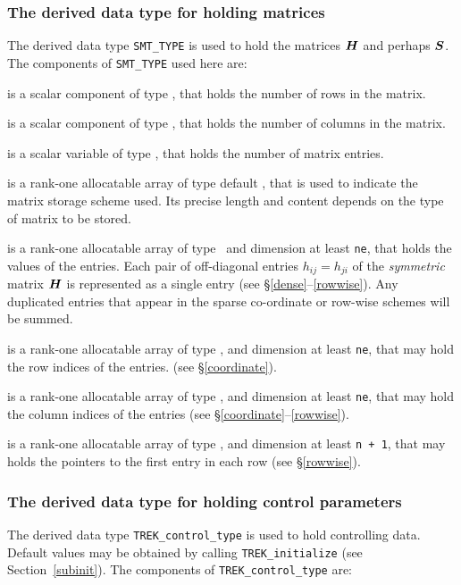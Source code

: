 \documentclass{galahad}
\newcommand{\packagename}{TREK}
\begin{document}
\subsubsection{The derived data type for holding matrices}\label{typesmt}
The derived data type {\tt SMT\_TYPE} is used to hold the matrices ${\bm{H}}$
and perhaps ${\bm{S}}$.
The components of {\tt SMT\_TYPE} used here are:

\begin{description}

 is a scalar component of type \integer,
that holds the number of rows in the matrix.

 is a scalar component of type \integer,
that holds the number of columns in the matrix.

 is a scalar variable of type \integer, that
holds the number of matrix entries.

 is a rank-one allocatable array of type default \character, that
is used to indicate the matrix storage scheme used. Its precise length and
content depends on the type of matrix to be stored.

 is a rank-one allocatable array of type \realdp\,
and dimension at least {\tt ne}, that holds the values of the entries.
Each pair of off-diagonal entries $h_{ij} = h_{ji}$ of the {\em symmetric}
matrix ${\bm{H}}$ is represented as a single entry
(see \S\ref{dense}--\ref{rowwise}).
Any duplicated entries that appear in the sparse
co-ordinate or row-wise schemes will be summed.

 is a rank-one allocatable array of type \integer,
and dimension at least {\tt ne}, that may hold the row indices of the entries.
(see \S\ref{coordinate}).

 is a rank-one allocatable array of type \integer,
and dimension at least {\tt ne}, that may hold the column indices of the entries
(see \S\ref{coordinate}--\ref{rowwise}).

 is a rank-one allocatable array of type \integer,
and dimension at least {\tt n + 1}, that may holds the pointers to
the first entry in each row (see \S\ref{rowwise}).

\end{description}


\subsubsection{The derived data type for holding control
 parameters}\label{typecontrol}
The derived data type
{\tt \packagename\_control\_type}
is used to hold controlling data. Default values may be obtained by calling
{\tt \packagename\_initialize}
(see Section~\ref{subinit}). The components of
{\tt \packagename\_control\_type}
are:
\end{document}

